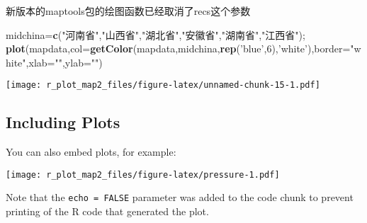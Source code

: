 \documentclass[]{article}
\newenvironment{Shaded}{\begin{snugshade}}{\end{snugshade}}
\newcommand{\KeywordTok}[1]{\textcolor[rgb]{0.13,0.29,0.53}{\textbf{#1}}}
\newcommand{\DataTypeTok}[1]{\textcolor[rgb]{0.13,0.29,0.53}{#1}}
\newcommand{\DecValTok}[1]{\textcolor[rgb]{0.00,0.00,0.81}{#1}}
\newcommand{\StringTok}[1]{\textcolor[rgb]{0.31,0.60,0.02}{#1}}
\newcommand{\NormalTok}[1]{#1}
\begin{document}
新版本的maptools包的绘图函数已经取消了recs这个参数

\begin{Shaded}
\begin{Highlighting}[]
\NormalTok{midchina=}\KeywordTok{c}\NormalTok{(}\StringTok{"河南省"}\NormalTok{,}\StringTok{"山西省"}\NormalTok{,}\StringTok{"湖北省"}\NormalTok{,}\StringTok{"安徽省"}\NormalTok{,}\StringTok{"湖南省"}\NormalTok{,}\StringTok{"江西省"}\NormalTok{);}
\KeywordTok{plot}\NormalTok{(mapdata,}\DataTypeTok{col=}\KeywordTok{getColor}\NormalTok{(mapdata,midchina,}\KeywordTok{rep}\NormalTok{(}\StringTok{'blue'}\NormalTok{,}\DecValTok{6}\NormalTok{),}\StringTok{'white'}\NormalTok{),}\DataTypeTok{border=}\StringTok{"white"}\NormalTok{,}\DataTypeTok{xlab=}\StringTok{""}\NormalTok{,}\DataTypeTok{ylab=}\StringTok{""}\NormalTok{)}
\end{Highlighting}
\end{Shaded}

\texttt{[image: r\_plot\_map2\_files/figure-latex/unnamed-chunk-15-1.pdf]}

\subsection{Including Plots}\label{including-plots}

You can also embed plots, for example:

\texttt{[image: r\_plot\_map2\_files/figure-latex/pressure-1.pdf]}

Note that the \texttt{echo\ =\ FALSE} parameter was added to the code
chunk to prevent printing of the R code that generated the plot.
\end{document}
